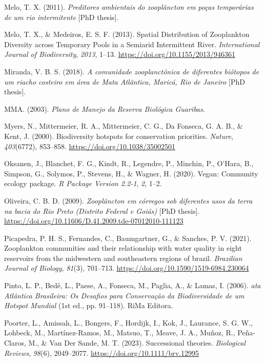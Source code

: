 \documentclass[
  letterpaper,
  DIV=11,
  numbers=noendperiod]{scrartcl}
\newlength{\cslhangindent}
\newenvironment{CSLReferences}[2] %
 {\begin{list}{}{%
  \setlength{\itemindent}{0pt}
  \setlength{\leftmargin}{0pt}
  \setlength{\parsep}{0pt}
  \ifodd #1
   \setlength{\leftmargin}{\cslhangindent}
   \setlength{\itemindent}{-1\cslhangindent}
  \fi
  \setlength{\itemsep}{#2\baselineskip}}}
 {\end{list}}
\begin{document}
\begin{CSLReferences}{1}{0}
Melo, T. X. (2011). \emph{Preditores ambientais do zooplâncton em poças
temporárias de um rio intermitente} {[}PhD thesis{]}.

Melo, T. X., \& Medeiros, E. S. F. (2013). Spatial Distribution of
Zooplankton Diversity across Temporary Pools in a Semiarid Intermittent
River. \emph{International Journal of Biodiversity}, \emph{2013}, 1--13.
\url{https://doi.org/10.1155/2013/946361}

Miranda, V. B. S. (2018). \emph{A comunidade zooplanctônica de
diferentes biótopos de um riacho costeiro em área de Mata Atlântica,
Maricá, Rio de Janeiro} {[}PhD thesis{]}.

MMA. (2003). \emph{Plano de Manejo da Reserva Biológica Guaribas}.

Myers, N., Mittermeier, R. A., Mittermeier, C. G., Da Fonseca, G. A. B.,
\& Kent, J. (2000). Biodiversity hotspots for conservation priorities.
\emph{Nature}, \emph{403}(6772), 853--858.
\url{https://doi.org/10.1038/35002501}

Oksanen, J., Blanchet, F. G., Kindt, R., Legendre, P., Minchin, P.,
O'Hara, B., Simpson, G., Solymos, P., Stevens, H., \& Wagner, H. (2020).
Vegan: Community ecology package. \emph{R Package Version 2.2-1},
\emph{2}, 1--2.

Oliveira, C. B. D. (2009). \emph{Zooplâncton em córregos sob diferentes
usos da terra na bacia do Rio Preto (Distrito Federal e Goiás)} {[}PhD
thesis{]}. \url{https://doi.org/10.11606/D.41.2009.tde-07012010-111123}

Picapedra, P. H. S., Fernandes, C., Baumgartner, G., \& Sanches, P. V.
(2021). Zooplankton communities and their relationship with water
quality in eight reservoirs from the midwestern and southeastern regions
of brazil. \emph{Brazilian Journal of Biology}, \emph{81}(3), 701--713.
\url{https://doi.org/10.1590/1519-6984.230064}

Pinto, L. P., Bedê, L., Paese, A., Fonseca, M., Paglia, A., \& Lamas, I.
(2006). \emph{ata Atlântica Brasileira: Os Desafios para Conservação da
Biodiversidade de um Hotspot Mundial} (1st ed., pp. 91--118). RiMa
Editora.

Poorter, L., Amissah, L., Bongers, F., Hordijk, I., Kok, J., Laurance,
S. G. W., Lohbeck, M., Martínez-Ramos, M., Matsuo, T., Meave, J. A.,
Muñoz, R., Peña-Claros, M., \& Van Der Sande, M. T. (2023). Successional
theories. \emph{Biological Reviews}, \emph{98}(6), 2049--2077.
\url{https://doi.org/10.1111/brv.12995}


\end{CSLReferences}
\end{document}
